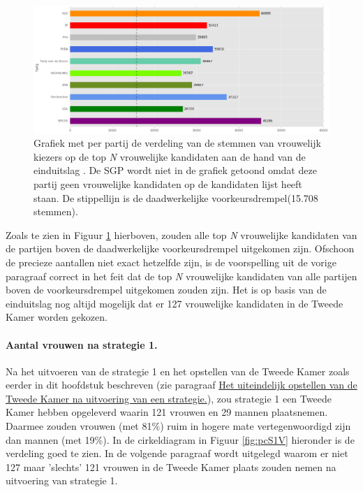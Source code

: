   
\begin{figure}[H]

	\includegraphics[width=\linewidth]	{stemmen_op_vrouwen_topN_uitslag.png}

			\caption{Grafiek met per partij de verdeling van de stemmen van vrouwelijk kiezers op de top \textit{N} vrouwelijke kandidaten aan de hand van de einduitslag \citep{Kiesraad_databank}. De SGP wordt niet in de grafiek getoond omdat deze partij geen vrouwelijke kandidaten op de kandidaten lijst heeft staan. De stippellijn is de daadwerkelijke voorkeursdrempel(15.708 stemmen).}

\label{fig:stemmenV2}
\end{figure}

Zoals te zien in Figuur \ref{fig:stemmenV2} hierboven, zouden alle top \textit{N} vrouwelijke kandidaten van de partijen boven de daadwerkelijke voorkeursdrempel uitgekomen zijn. Ofschoon de precieze aantallen niet exact hetzelfde zijn, is de voorspelling uit de vorige paragraaf correct in het feit dat de top \textit{N} vrouwelijke kandidaten van alle partijen boven de voorkeursdrempel uitgekomen zouden zijn. Het is op basis van de einduitslag nog altijd mogelijk dat er 127 vrouwelijke kandidaten in de Tweede Kamer worden gekozen. 

\paragraph{Aantal vrouwen na strategie 1.}
Na het uitvoeren van de strategie 1 en het opstellen van de Tweede Kamer zoals eerder in dit hoofdstuk beschreven (zie paragraaf \hyperref[opstellen]{Het uiteindelijk opstellen van de Tweede Kamer na uitvoering van een strategie.}), zou strategie 1 een Tweede Kamer hebben opgeleverd waarin 121 vrouwen en 29 mannen plaatsnemen. Daarmee zouden vrouwen (met 81\%) ruim in hogere mate vertegenwoordigd zijn dan mannen (met 19\%). In de cirkeldiagram in Figuur \ref{fig:pcS1V} hieronder is de verdeling goed te zien. In de volgende paragraaf wordt uitgelegd waarom er niet 127 maar 'slechts' 121 vrouwen in de Tweede Kamer plaats zouden nemen na uitvoering van strategie 1.

